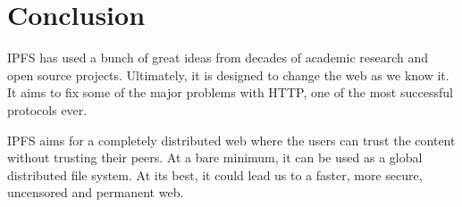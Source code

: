 \chapter{Conclusion}

IPFS has used a bunch of great ideas from decades of academic research and open source projects. Ultimately, it is designed to change the web as we know it. It aims to fix some of the major problems with HTTP, one of the most successful protocols ever.

IPFS aims for a completely distributed web where the users can trust the content without trusting their peers. At a bare minimum, it can be used as a global distributed file system. At its best, it could lead us to a faster, more secure, uncensored and permanent web.